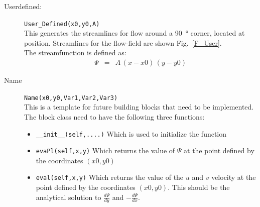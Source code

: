 \documentclass[10pt,a4paper]{article}
\begin{document}
\begin{description}
\item[User\textunderscore defined:] \verb'User_Defined(x0,y0,A)' \\ 
This generates the streamlines for flow around a \SI{90}{\degree} corner, located at position. 
Streamlines for the flow-field are shown Fig.~\ref{F_User}. \\
The streamfunction is defined as: 
\begin{eqnarray}
\Psi &=& A  \,  \left(x - x0\right) \,  \left(y - y0\right)
\end{eqnarray}

\item[Name] \verb'Name(x0,y0,Var1,Var2,Var3)' \\
This is a template for future building blocks that need to be implemented. 
The block class need to have the following three functions:
	\begin{itemize}
	\item \verb'__init__(self,....)' Which is used to initialize the function
	\item \verb'evaPl(self,x,y)' Which returns the value of $\Psi$ at the point defined by the coordinates  $(x0,y0)$
	\item \verb'eval(self,x,y)' Which returns the value of the $u$ and $v$ velocity at the point defined by the coordinates  $(x0,y0)$. 
		This should be the analytical solution to $\frac{d \Psi}{dy}$ and $-\frac{d \Psi}{dx}$.
	\end{itemize}
\end{description}
\end{document}
